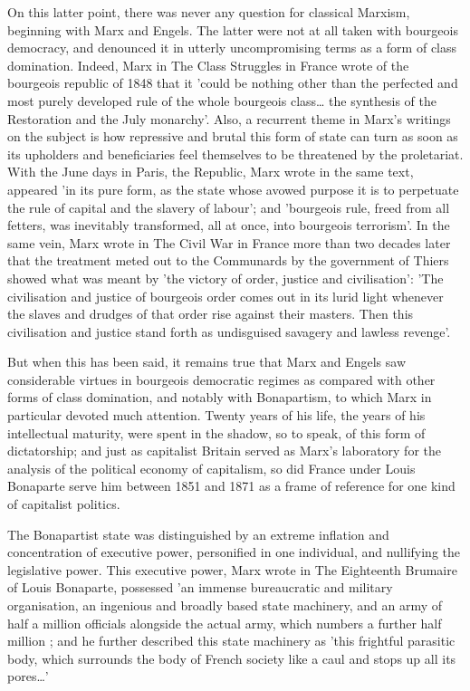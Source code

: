 On this latter point, there was never any question for classical Marxism, beginning with Marx and Engels. The latter were not at all taken with bourgeois democracy, and denounced it in utterly uncompromising terms as a form of class domination. Indeed, Marx in The Class Struggles in France wrote of the bourgeois republic of 1848 that it 'could be nothing other than the perfected and most purely developed rule of the whole bourgeois class\dots{} the synthesis of the Restoration and the July monarchy'. Also, a recurrent theme in Marx's writings on the subject is how repressive and brutal this form of state can turn as soon as its upholders and beneficiaries feel themselves to be threatened by the proletariat. With the June days in Paris, the Republic, Marx wrote in the same text, appeared 'in its pure form, as the state whose avowed purpose it is to perpetuate the rule of capital and the slavery of labour'; and 'bourgeois rule, freed from all fetters, was inevitably transformed, all at once, into bourgeois terrorism'. In the same vein, Marx wrote in The Civil War in France more than two decades later that the treatment meted out to the Communards by the government of Thiers showed what was meant by 'the victory of order, justice and civilisation': 'The civilisation and justice of bourgeois order comes out in its lurid light whenever the slaves and drudges of that order rise against their masters. Then this civilisation and justice stand forth as undisguised savagery and lawless revenge'.

But when this has been said, it remains true that Marx and Engels saw considerable virtues in bourgeois democratic regimes as compared with other forms of class domination, and notably with Bonapartism, to which Marx in particular devoted much attention. Twenty years of his life, the years of his intellectual maturity, were spent in the shadow, so to speak, of this form of dictatorship; and just as capitalist Britain served as Marx's laboratory for the analysis of the political economy of capitalism, so did France under Louis Bonaparte serve him between 1851 and 1871 as a frame of reference for one kind of capitalist politics.

 The Bonapartist state was distinguished by an extreme inflation and concentration of executive power, personified in one individual, and nullifying the legislative power. This executive power, Marx wrote in The Eighteenth Brumaire of Louis Bonaparte, possessed 'an immense bureaucratic and military organisation, an ingenious and broadly based state machinery, and an army of half a million officials alongside the actual army, which numbers a further half million ; and he further described this state machinery as 'this frightful parasitic body, which surrounds the body of French society like a caul and stops up all its pores\dots'
 
